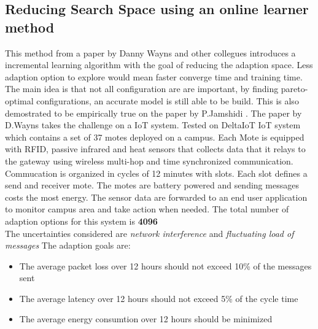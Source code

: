 \documentclass[pdftex,english,oribibl]{llncs}
\begin{document}
\subsection{Reducing Search Space using an online learner method}
This method from a paper by Danny Wayns and other collegues \citep{efficientAnalysisAdaptionSpaces} introduces a incremental learning algorithm with the goal of reducing the adaption space. Less adaption option to explore would mean faster converge time and training time. The main idea is that not all configuration are are important, by finding pareto-optimal configurations, an accurate model is still able to be build. This is also  demostrated to be empirically true on the paper by P.Jamshidi  \cite{SAAutoRobots}.
The paper by D.Wayns \cite{efficientAnalysisAdaptionSpaces} takes the challenge on a IoT system. 
Tested on DeltaIoT IoT system which contains a set of 37 motes deployed on a campus. Each Mote is equipped with
RFID, passive infrared and heat sensors that collects data that it relays to the gateway using wireless 
multi-hop and time synchronized communication. Commucation is organized in cycles of 12  minutes with slots. Each slot defines
a send and receiver mote. The motes are battery powered and sending messages costs the most energy.
The sensor data are forwarded to an end user application to monitor
campus area and take action when needed. The total number of adaption options for this system is \textbf{4096}
\\
The uncertainties considered are \textit{network interference} and \textit{fluctuating load of messages}
The adaption goals are:
\begin{itemize}
	\item The average packet loss over 12 hours should not exceed 10\% of the messages sent
	\item The average latency over 12 hours should not exceed 5\% of the cycle time
	\item The average energy consumtion over 12 hours should be minimized
\end{itemize}
\end{document}

